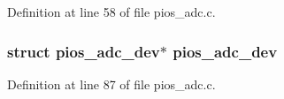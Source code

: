 Definition at line 58 of file pios\-\_\-adc.\-c.

\hypertarget{group___p_i_o_s___a_d_c_gab32db3584e1b8779726fcabc7aa2dc9a}{
\subsubsection[{pios\-\_\-adc\-\_\-dev}]{\setlength{\rightskip}{0pt plus 5cm}struct {\bf pios\-\_\-adc\-\_\-dev}$\ast$ {\bf pios\-\_\-adc\-\_\-dev}}}\label{group___p_i_o_s___a_d_c_gab32db3584e1b8779726fcabc7aa2dc9a}


Definition at line 87 of file pios\-\_\-adc.\-c.

